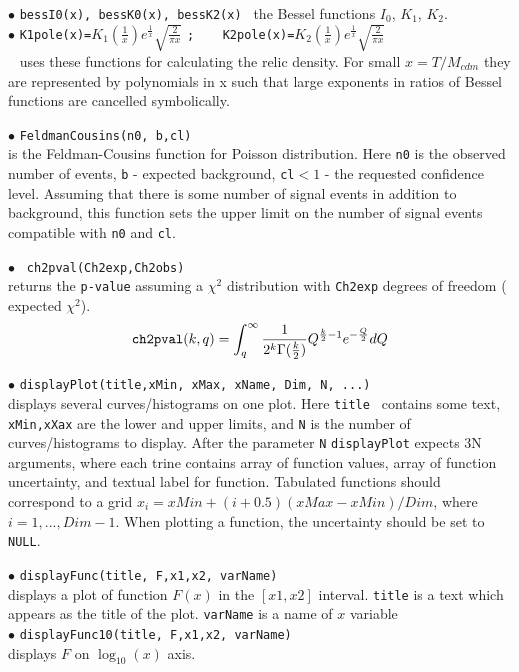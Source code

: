\documentclass[12pt,a4paper]{article}
\begin{document}
{\noindent$\bullet$ \verb|bessI0(x), bessK0(x), bessK2(x) | the Bessel functions $I_0$,  $K_1$,
$K_2$.\\ 

\noindent$\bullet$ \verb|K1pole(x)=|$K_1(\frac{1}{x}) e^\frac{1}{x}
\sqrt{\frac{2}{\pi x}}$ \verb|;    K2pole(x)=|$K_2(\frac{1}{x}) e^\frac{1}{x}
\sqrt{\frac{2}{\pi x}}$   \\
\micro~ uses these functions for calculating the  relic density. For
small $x=T/M_{cdm}$ they are represented by polynomials in x such that  large exponents
in ratios of  Bessel functions  are cancelled symbolically.  


\noindent$\bullet$ \verb|FeldmanCousins(n0, b,cl)|\\
is the Feldman-Cousins \cite{Feldman:1997qc}  function for Poisson distribution.
Here {\tt n0} is the observed number of events, {\tt b} -  expected background,
\verb|cl|$ < 1 $ - the requested confidence level. Assuming that  
there is some number of signal events in addition to background, this function sets the upper limit on the number 
of signal events compatible with {\tt n0}  and {\tt cl}.

\noindent$\bullet$ \verb| ch2pval(Ch2exp,Ch2obs)|\\ 
returns the {\tt p-value} assuming a $\chi^2$ distribution with  {\tt Ch2exp} degrees
of freedom ( expected  $\chi^2$).  
$$   
{  \verb|ch2pval|(k,q)=\int_q^\infty  \frac{1}{2^k \Gamma(\frac{k}{2})} Q^{\frac{k}{2}-1}
e^{-\frac{Q}{2}} dQ } $$   

\noindent$\bullet$ \verb|displayPlot(title,xMin, xMax, xName, Dim, N, ...)|\\
displays several  curves/histograms on one plot.  Here {\tt title  } contains some text, {\tt
xMin,xXax} are the lower and upper limits,   and {\tt N} is the number of
curves/histograms  to display.  After the parameter {\tt N} {\tt displayPlot} expects 3N arguments, where each 
trine contains  array  of function values, array  of function uncertainty,
and  textual label for function. Tabulated functions should correspond to a grid
$x_i=xMin+(i+0.5)(xMax-xMin)/Dim$, where $i=1,...,Dim-1$.  When  plotting a function, 
the uncertainty should be set to {\tt NULL}.    


\noindent$\bullet$ \verb|displayFunc(title, F,x1,x2, varName)|\\
displays a plot of function $F(x)$ in the  $[x1,x2]$ interval. \verb|title| is a text 
which appears as the title of the plot. {\tt varName} is a name of $x$ variable \\
\noindent$\bullet$ \verb|displayFunc10(title, F,x1,x2, varName)|\\
displays $F$ on  $\log_{10}(x)$ axis. 


}
\end{document}
